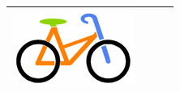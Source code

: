 \documentclass[12pt, a4paper]{article}
\begin{document}
\begin{minipage}{\textwidth}
\begin{table}[H]
\begin{tabulary}{\linewidth}{|C|C|C|C|}
					\includegraphics[width=\linewidth]{option4} \\
					\hline 
				\end{tabulary}
			\end{table}
	\end{minipage} \\ \\
		
\end{document}
